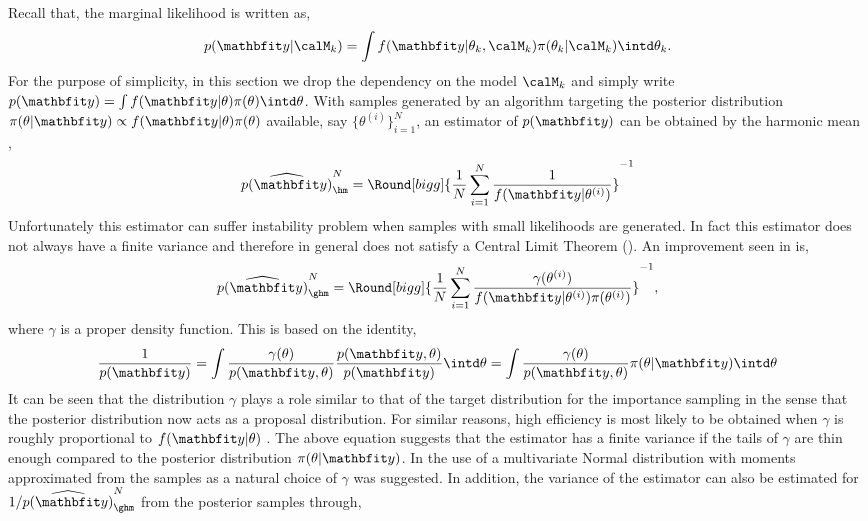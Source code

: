 Recall that, the marginal likelihood is written as,
\begin{equation*}
  p(\data|\calM_k) = \int
  f(\data|\theta_k,\calM_k)\pi(\theta_k|\calM_k)\intd\theta_k.
\end{equation*}
For the purpose of simplicity, in this section we drop the dependency on the model $\calM_k$ and simply write $p(\data) = \int f(\data|\theta)\pi(\theta)\intd\theta$. With samples generated by an \mcmc algorithm targeting the posterior distribution $\pi(\theta|\data) \propto f(\data|\theta) \pi(\theta)$ available, say $\{\theta^{(i)}\}_{i=1}^N$, an estimator of $p(\data)$ can be obtained by the harmonic mean \cite{Newton:1994wm},
\begin{equation}
  \widehat{p(\data)}_{\hm}^N =
  \Round[bigg]{\frac{1}{N}\sum_{i=1}^N\frac{1}{f(\data|\theta^{(i)})}}^{-1}
\end{equation}
Unfortunately this estimator can suffer instability problem when samples with small likelihoods are generated. In fact this estimator does not always have a finite variance and therefore in general does not satisfy a Central Limit Theorem (\clt). An improvement seen in \cite{Kass:1995vb} is,
\begin{equation}
  \widehat{p(\data)}_{\ghm}^N = \Round[bigg]{
    \frac{1}{N}\sum_{i=1}^N
    \frac{\gamma(\theta^{(i)})}{f(\data|\theta^{(i)})\pi(\theta^{(i)})}}^{-1},
\end{equation}
where $\gamma$ is a proper density function. This is based on the identity,
\begin{equation}
  \frac{1}{p(\data)}
  = \int \frac{\gamma(\theta)}{p(\data,\theta)}
  \frac{p(\data,\theta)}{p(\data)} \intd \theta
  = \int \frac{\gamma(\theta)}{p(\data,\theta)} \pi(\theta|\data) \intd \theta
\end{equation}
It can be seen that the distribution $\gamma$ plays a role similar to that of the target distribution for the importance sampling in the sense that the posterior distribution now acts as a proposal distribution. For similar reasons, high efficiency is most likely to be obtained when $\gamma$ is roughly proportional to $f(\data|\theta)$ \cite{Kass:1995vb}. The above equation suggests that the estimator has a finite variance if the tails of $\gamma$ are thin enough compared to the posterior distribution $\pi(\theta|\data)$. In \cite{Gelfand:1994ux} the use of a multivariate Normal distribution with moments approximated from the samples as a natural choice of $\gamma$ was suggested. In addition, the variance of the estimator can also be estimated for $1/\widehat{p(\data)}_{\ghm}^N$ from the posterior samples through,
